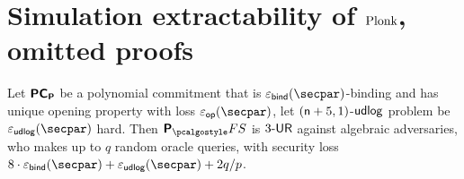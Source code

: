 \section{Simulation extractability of $\textnormal{{Plonk}}$, omitted proofs}
\label{sec:plonkse_proofs}



\begin{lemma}
	\label{lem:app:plonkprot_ur}
	Let $\bm{\mathsf{PC}}_{\bm{\mathsf{P}}}$ be a polynomial commitment that is $\epsbind(\secpar)$-binding and has unique opening property with loss $\epsop (\secpar)$, let $(\mathsf{n} + 5, 1)$-$\mathsf{udlog}$ problem be $\epsudlog (\secpar)$ hard. Then $\plonkprotfs$ is ${3\text{-}\mathsf{UR}}$ against algebraic adversaries, who makes up to $q$ random oracle queries, with security loss $8  \cdot \epsbinding (\secpar) + \epsudlog (\secpar) + 2 \infrac{q}{p}$.
\end{lemma}

